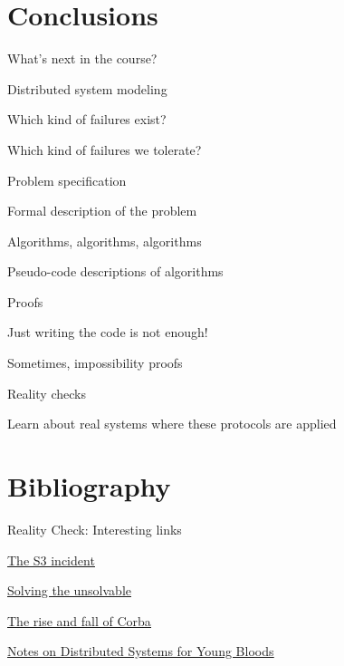 \section{Conclusions}

\begin{frame}{What's next in the course?}
\BI
\item Distributed system modeling
\BI
\item Which kind of failures exist? 
\item Which kind of failures we tolerate?
\EI
\bigskip
\item Problem specification
\BI
\item Formal description of the problem
\EI
\item Algorithms, algorithms, algorithms
\BI
\item Pseudo-code descriptions of algorithms
\EI
\bigskip
\item Proofs
\BI
\item Just writing the code is not enough!
\item Sometimes, impossibility proofs
\EI
\bigskip
\item Reality checks
\BI
\item Learn about real systems where these protocols are applied
\EI
\EI
\end{frame}


\section{Bibliography}

\ReadingMaterial



{
\begin{frame}{Reality Check: Interesting links}

\BI
\item \href{http://status.aws.amazon.com/s3-20080720.html}{\underline{The S3 incident}}
\item \href{http://cacm.acm.org/magazines/2011/7/109895-solving-the-unsolvable/fulltext}{\underline{Solving the unsolvable}}
\item \href{http://queue.acm.org/detail.cfm?id=1142044}{\underline{The rise and fall of Corba}}
\item \href{https://www.somethingsimilar.com/2013/01/14/notes-on-distributed-systems-for-young-bloods/}{\underline{Notes on Distributed Systems for Young Bloods}}
\EI

\end{frame}
}


 

